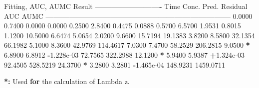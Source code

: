 \documentclass[12pt,]{krantz}
\newenvironment{Shaded}{\begin{snugshade}}{\end{snugshade}}
\newcommand{\FloatTok}[1]{\textcolor[rgb]{0.00,0.00,0.81}{#1}}
\newcommand{\StringTok}[1]{\textcolor[rgb]{0.31,0.60,0.02}{#1}}
\newcommand{\ControlFlowTok}[1]{\textcolor[rgb]{0.13,0.29,0.53}{\textbf{#1}}}
\newcommand{\OperatorTok}[1]{\textcolor[rgb]{0.81,0.36,0.00}{\textbf{#1}}}
\newcommand{\ErrorTok}[1]{\textcolor[rgb]{0.64,0.00,0.00}{\textbf{#1}}}
\newcommand{\NormalTok}[1]{#1}
\theoremstyle{definition}
\theoremstyle{definition}
\theoremstyle{definition}
\theoremstyle{remark}
\begin{document}
\begin{Shaded}
\begin{Highlighting}[]
\NormalTok{Fitting, AUC, AUMC Result}
\OperatorTok{-------------------------}
\StringTok{      }\NormalTok{Time         Conc.      Pred.   Residual       AUC       AUMC}
\OperatorTok{---------------------------------------------------------------------}
\StringTok{     }\FloatTok{0.0000}       \FloatTok{0.7400}                           \FloatTok{0.0000}     \FloatTok{0.0000}
     \FloatTok{0.2500}       \FloatTok{2.8400}                           \FloatTok{0.4475}     \FloatTok{0.0888}
     \FloatTok{0.5700}       \FloatTok{6.5700}                           \FloatTok{1.9531}     \FloatTok{0.8015}
     \FloatTok{1.1200}      \FloatTok{10.5000}                           \FloatTok{6.6474}     \FloatTok{5.0654}
     \FloatTok{2.0200}       \FloatTok{9.6600}                          \FloatTok{15.7194}    \FloatTok{19.1383}
     \FloatTok{3.8200}       \FloatTok{8.5800}                          \FloatTok{32.1354}    \FloatTok{66.1982}
     \FloatTok{5.1000}       \FloatTok{8.3600}                          \FloatTok{42.9769}   \FloatTok{114.4617}
     \FloatTok{7.0300}       \FloatTok{7.4700}                          \FloatTok{58.2529}   \FloatTok{206.2815}
     \FloatTok{9.0500} \OperatorTok{*}\StringTok{     }\FloatTok{6.8900}     \FloatTok{6.8912} \OperatorTok{-}\FloatTok{1.228e-03}    \FloatTok{72.7565}   \FloatTok{322.2988}
    \FloatTok{12.1200} \OperatorTok{*}\StringTok{     }\FloatTok{5.9400}     \FloatTok{5.9387} \OperatorTok{+}\FloatTok{1.324e-03}    \FloatTok{92.4505}   \FloatTok{528.5219}
    \FloatTok{24.3700} \OperatorTok{*}\StringTok{     }\FloatTok{3.2800}     \FloatTok{3.2801} \OperatorTok{-}\FloatTok{1.465e-04}   \FloatTok{148.9231}  \FloatTok{1459.0711}

\OperatorTok{*}\ErrorTok{:}\StringTok{ }\NormalTok{Used }\ControlFlowTok{for}\NormalTok{ the calculation of Lambda z.}



\end{Highlighting}
\end{Shaded}
\end{document}
